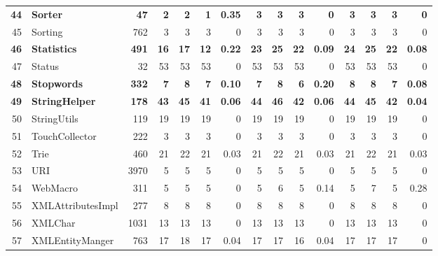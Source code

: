 \documentclass{acm_proc_article-sp}
\begin{document}
\begin{table} [htp!]
{\begin{tabularx}{1 \textwidth}{r l r r r r r r r r r r r r r}
\textbf{44}						& \textbf{Sorter}					&\textbf{47}			& \textbf{2}		&	\textbf{2}	&	\textbf{1}	& 	\textbf{0.35}					& \textbf{3}		& \textbf{3} 		& \textbf{3}		& 		\textbf{0}			&\textbf{3}			& \textbf{3}			& \textbf{3}			&	\textbf{0}\\      
45						& Sorting					&762		& 3		&	3	&	3	& 	0					& 3		& 3 		& 3		& 		0			& 3			& 3			& 3			&	0\\      
\textbf{46}						& \textbf{Statistics}				&\textbf{491}		& \textbf{16}		&	\textbf{17}	&	\textbf{12}	&	\textbf{0.22}					& \textbf{23}		& \textbf{25} 		& \textbf{22}		& 		\textbf{0.09}			& \textbf{24}			& \textbf{25}			& \textbf{22}			&	\textbf{0.08}\\      
47						& Status					&32			& 53		&	53	&	53	& 	0					& 53		& 53 		& 53		& 		0			& 53			& 53			& 53			&	0\\      
\textbf{48}						& \textbf{Stopwords}				&\textbf{332}		& \textbf{7}		&	\textbf{8}	&	\textbf{7}	& 	\textbf{0.10}					& \textbf{7}		&  \textbf{8}		& \textbf{6}		& 		\textbf{0.20}			& \textbf{8}			& \textbf{8}			& \textbf{7}			&	\textbf{0.08}\\      
\textbf{49}						& \textbf{StringHelper}				&\textbf{178}		& \textbf{43}	 	& 	\textbf{45}	&	\textbf{41}	& 	\textbf{0.06}					& \textbf{44}		&  \textbf{46}		& \textbf{42}		& 		\textbf{0.06}			& \textbf{44}			& \textbf{45}			& \textbf{42}			&	\textbf{0.04}\\      
50						& StringUtils				&119		& 19 		&	19	&	19	& 	0					& 19		& 19 		& 19		& 		0			& 19			& 19			& 19			&	0\\      
51						& TouchCollector			&222		& 3		&	3	&	3	& 	0					& 3		&  3		& 3		& 		0			& 3			& 3			& 3			&	0\\      
52						& Trie					&460		& 21		&	22	&	21	& 	0.03					& 21		&  22		& 21		& 		0.03			& 21			& 22			& 21			&	0.03\\      
53						& URI					&3970		& 5 		&	5	&	5	& 	0					& 5		&  5		& 5		& 		0			& 5			& 5			& 5			&	0\\      
54						& WebMacro				&311		& 5		&	5	&	5	& 	0					& 5		&  6		& 5		& 		0.14			& 5			& 7			& 5			&	0.28\\      
55						& XMLAttributesImpl			&277		& 8		&	8	&	8	& 	0					& 8		&  8		& 8		& 		0			& 8			& 8			& 8			&	0\\      
56						& XMLChar				&1031		& 13		&	13	&	13	& 	0					& 13		&  13		& 13		& 		0			& 13			& 13			& 13			&	0\\      
57						& XMLEntityManger			&763		& 17		&	18	&	17	& 	0.04					& 17		&  17		& 16		& 		0.04			& 17			& 17			& 17			&	0\\      

\end{tabularx}}
\end{table}
\end{document}
